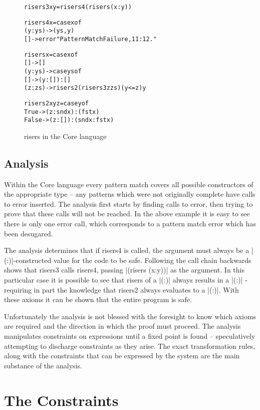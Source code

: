 \documentclass[preprint]{sigplanconf}
\newcommand{\C}[1]{\textsf{#1}}
\newenvironment{code}{\begin{alltt}\small}{\end{alltt}}
\begin{document}
\begin{figure}
\begin{code}
risers3 x y = risers4 (risers (x : y))

risers4 x = case x of
    (y:ys) -> (ys, y)
    [] -> error "Pattern Match Failure, 11:12."

risers x = case x of
    [] -> []
    (y:ys) ->  case ys of
         [] -> (y : []) : []
         (z:zs) -> risers2 (risers3 z zs) (y <= z) y

risers2 x y z =  case y of
    True -> (z : snd x) : (fst x)
    False -> (z : []) : (snd x : fst x)
\end{code}
\caption{\C{risers} in the Core language}
\label{fig:risers_core}
\end{figure}

\subsection{Analysis}

Within the Core language every pattern match covers all possible constructors of the appropriate type -- any patterns which were not originally complete have calls to \C{error} inserted. The analysis first starts by finding calls to \C{error}, then trying to prove that these calls will not be reached. In the above example it is easy to see there is only one \C{error} call, which corresponds to a pattern match error which has been desugared.

The analysis determines that if \C{risers4} is called, the argument must always be a |(:)|-constructed value for the code to be safe. Following the call chain backwards shows that \C{risers3} calls \C{risers4}, passing |(risers (x:y))| as the argument. In this particular case it is possible to see that risers of a |(:)| always results in a |(:)| - requiring in part the knowledge that \C{risers2} always evaluates to a |(:)|. With these axioms it can be shown that the entire program is safe.

Unfortunately the analysis is not blessed with the foresight to know which axioms are required and the direction in which the proof must proceed. The analysis manipulates constraints on expressions until a fixed point is found -- speculatively attempting to discharge constraints as they arise. The exact transformation rules, along with the constraints that can be expressed by the system are the main substance of the analysis.


\section{The Constraints}
\label{sec:manipulate}
\end{document}
